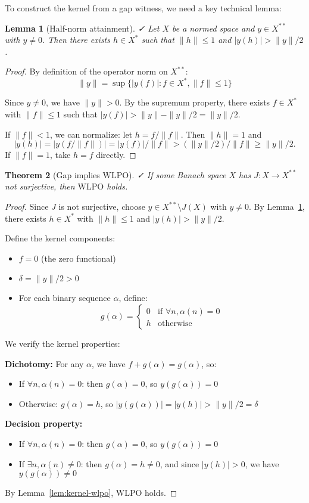 \documentclass[11pt]{article}  %
\newtheorem{theorem}{Theorem}[section]
\newtheorem{lemma}[theorem]{Lemma}
\newenvironment{thm}{\begin{theorem}}{\end{theorem}}
\newenvironment{lem}{\begin{lemma}}{\end{lemma}}
\newcommand{\leanok}{\textsf{\small \textcolor{green!70!black}{✓}}}
\newcommand{\WLPO}{\mathrm{WLPO}}
\begin{document}
To construct the kernel from a gap witness, we need a key technical lemma:

\begin{lem}[Half-norm attainment]\label{lem:half-norm}\leanok
Let $X$ be a normed space and $y\in X^{**}$ with $y\ne 0$. Then there exists $h\in X^*$ such that $\|h\|\le 1$ and $|y(h)|>\|y\|/2$.
\end{lem}

\begin{proof}
By definition of the operator norm on $X^{**}$:
\[
\|y\| = \sup\{|y(f)| : f\in X^*, \|f\|\le 1\}
\]

Since $y\ne 0$, we have $\|y\|>0$. By the supremum property, there exists $f\in X^*$ with $\|f\|\le 1$ such that $|y(f)|>\|y\|-\|y\|/2=\|y\|/2$.

If $\|f\|<1$, we can normalize: let $h=f/\|f\|$. Then $\|h\|=1$ and 
\[
|y(h)| = |y(f/\|f\|)| = |y(f)|/\|f\| > (\|y\|/2)/\|f\| \ge \|y\|/2.
\]
If $\|f\|=1$, take $h=f$ directly.
\end{proof}

\begin{thm}[Gap implies $\WLPO$]\label{thm:gap-implies-wlpo}\leanok
If some Banach space $X$ has $J:X\to X^{**}$ not surjective, then $\WLPO$ holds.
\end{thm}

\begin{proof}
Since $J$ is not surjective, choose $y\in X^{**}\setminus J(X)$ with $y\ne 0$. By Lemma~\ref{lem:half-norm}, there exists $h\in X^*$ with $\|h\|\le 1$ and $|y(h)|>\|y\|/2$.

Define the kernel components:
\begin{itemize}
\item $f=0$ (the zero functional)
\item $\delta=\|y\|/2>0$
\item For each binary sequence $\alpha$, define:
\[
g(\alpha)=\begin{cases}
0 & \text{if } \forall n,\alpha(n)=0\\
h & \text{otherwise}
\end{cases}
\]
\end{itemize}

We verify the kernel properties:

\textbf{Dichotomy:} For any $\alpha$, we have $f+g(\alpha)=g(\alpha)$, so:
\begin{itemize}
\item If $\forall n,\alpha(n)=0$: then $g(\alpha)=0$, so $y(g(\alpha))=0$
\item Otherwise: $g(\alpha)=h$, so $|y(g(\alpha))|=|y(h)|>\|y\|/2=\delta$
\end{itemize}

\textbf{Decision property:} 
\begin{itemize}
\item If $\forall n,\alpha(n)=0$: then $g(\alpha)=0$, so $y(g(\alpha))=0$
\item If $\exists n,\alpha(n)\ne 0$: then $g(\alpha)=h\ne 0$, and since $|y(h)|>0$, we have $y(g(\alpha))\ne 0$
\end{itemize}

By Lemma~\ref{lem:kernel-wlpo}, $\WLPO$ holds.
\end{proof}
\end{document}
